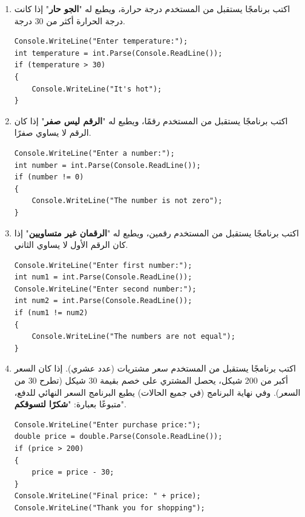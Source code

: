 \documentclass[14pt]{extarticle}
\begin{document}
\begin{enumerate}[resume, itemsep=2em]

\item
اكتب برنامجًا يستقبل من المستخدم درجة حرارة، ويطبع له "\textbf{الجو حار}" إذا كانت درجة الحرارة أكثر من 30 درجة.
\ifwithsols
\begin{boxSolution}
\begin{english}
\begin{verbatim}
Console.WriteLine("Enter temperature:");
int temperature = int.Parse(Console.ReadLine());
if (temperature > 30)
{
    Console.WriteLine("It's hot");
}
\end{verbatim}
\end{english}
\end{boxSolution}
\fi

\filbreak
\item
اكتب برنامجًا يستقبل من المستخدم رقمًا، ويطبع له "\textbf{الرقم ليس صفر}" إذا كان الرقم لا يساوي صفرًا.
\ifwithsols
\begin{boxSolution}
\begin{english}
\begin{verbatim}
Console.WriteLine("Enter a number:");
int number = int.Parse(Console.ReadLine());
if (number != 0)
{
    Console.WriteLine("The number is not zero");
}
\end{verbatim}
\end{english}
\end{boxSolution}
\clearpage
\fi

\filbreak
\item
اكتب برنامجًا يستقبل من المستخدم رقمين، ويطبع له "\textbf{الرقمان غير متساويين}" إذا كان الرقم الأول لا يساوي الثاني.
\ifwithsols
\begin{boxSolution}
\begin{english}
\begin{verbatim}
Console.WriteLine("Enter first number:");
int num1 = int.Parse(Console.ReadLine());
Console.WriteLine("Enter second number:");
int num2 = int.Parse(Console.ReadLine());
if (num1 != num2)
{
    Console.WriteLine("The numbers are not equal");
}
\end{verbatim}
\end{english}
\end{boxSolution}
\fi

\filbreak
\item
اكتب برنامجًا يستقبل من المستخدم سعر مشتريات (عدد عشري). إذا كان السعر أكبر من 200 شيكل، يحصل المشتري على خصم بقيمة 30 شيكل (تطرح 30 من السعر). وفي نهاية البرنامج (في جميع الحالات) يطبع البرنامج السعر النهائي للدفع، متبوعًا بعبارة: "\textbf{شكرًا لتسوقكم}".
\ifwithsols
\begin{boxSolution}
\begin{english}
\begin{verbatim}
Console.WriteLine("Enter purchase price:");
double price = double.Parse(Console.ReadLine());
if (price > 200)
{
    price = price - 30;
}
Console.WriteLine("Final price: " + price);
Console.WriteLine("Thank you for shopping");
\end{verbatim}
\end{english}
\end{boxSolution}
\fi


\end{enumerate}
\end{document}
